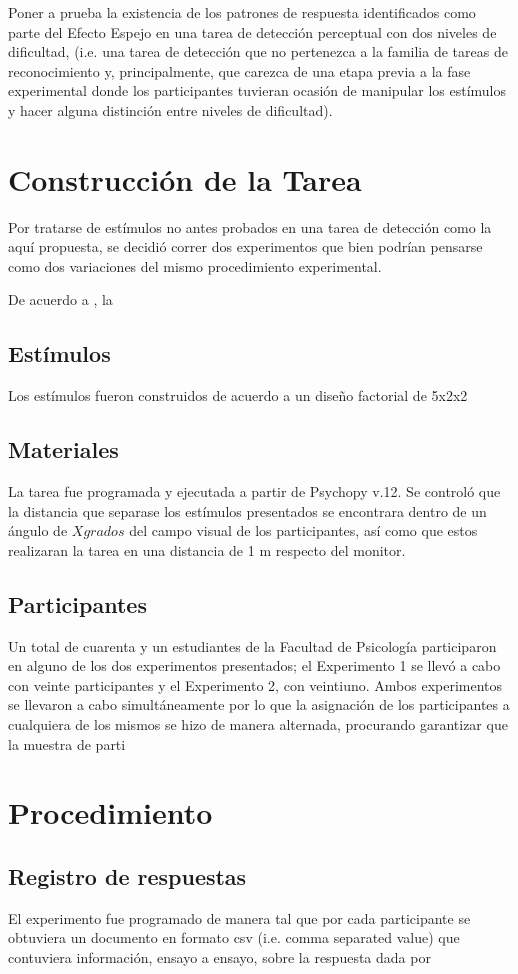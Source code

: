 Poner a prueba la existencia de los patrones de respuesta identificados como parte del Efecto Espejo en una tarea de detección perceptual con dos niveles de dificultad, (i.e. una tarea de detección que no pertenezca a la familia de tareas de reconocimiento y, principalmente, que carezca de una etapa previa a la fase experimental donde los participantes tuvieran ocasión de manipular los estímulos y hacer alguna distinción entre niveles de dificultad).


\section{Construcción de la Tarea}

Por tratarse de estímulos no antes probados en una tarea de detección como la aquí propuesta, se decidió correr dos experimentos que bien podrían pensarse como dos variaciones del mismo procedimiento experimental. 

De acuerdo a \parencite{Massaro1971}, la 

\subsection{Estímulos}

Los estímulos fueron construidos de acuerdo a un diseño factorial de 5x2x2 

\subsection{Materiales}
La tarea fue programada y ejecutada a partir de Psychopy v.12. Se controló que la distancia que separase los estímulos presentados se encontrara dentro de un ángulo de $X grados$ del campo visual de los participantes, así como que estos realizaran la tarea en una distancia de 1 m respecto del monitor.

\subsection{Participantes}

Un total de cuarenta y un estudiantes de la Facultad de Psicología participaron en alguno de los dos experimentos presentados; el Experimento 1 se llevó a cabo con veinte participantes y el Experimento 2, con veintiuno. Ambos experimentos se llevaron a cabo simultáneamente por lo que la asignación de los participantes a cualquiera de los mismos se hizo de manera alternada, procurando garantizar que la muestra de parti

\section{Procedimiento}



\subsection{Registro de respuestas}

El experimento fue programado de manera tal que por cada participante se obtuviera un documento en formato csv (i.e. comma separated value) que contuviera información, ensayo a ensayo, sobre la respuesta dada por 
